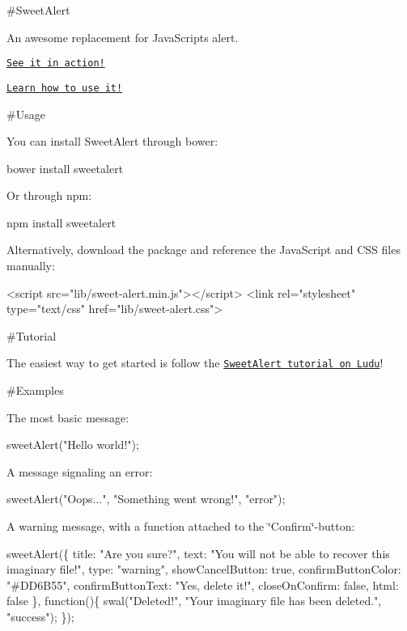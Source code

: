 \#\+Sweet\+Alert

An awesome replacement for Java\+Script\textquotesingle{}s alert.



\href{http://tristanedwards.me/sweetalert}{\tt See it in action!}

\href{https://www.ludu.co/lesson/how-to-use-sweetalert}{\tt Learn how to use it!}

\#\+Usage

You can install Sweet\+Alert through bower\+:


\begin{DoxyCode}
bower install sweetalert
\end{DoxyCode}


Or through npm\+:


\begin{DoxyCode}
npm install sweetalert
\end{DoxyCode}


Alternatively, download the package and reference the Java\+Script and C\+SS files manually\+:


\begin{DoxyCode}
<script src="lib/sweet-alert.min.js"></script>
<link rel="stylesheet" type="text/css" href="lib/sweet-alert.css">
\end{DoxyCode}


\#\+Tutorial

The easiest way to get started is follow the \href{https://www.ludu.co/lesson/how-to-use-sweetalert}{\tt Sweet\+Alert tutorial on Ludu}!

\#\+Examples

The most basic message\+:


\begin{DoxyCode}
sweetAlert("Hello world!");
\end{DoxyCode}


A message signaling an error\+:


\begin{DoxyCode}
sweetAlert("Oops...", "Something went wrong!", "error");
\end{DoxyCode}


A warning message, with a function attached to the \char`\"{}\+Confirm\char`\"{}-\/button\+:


\begin{DoxyCode}
sweetAlert(\{
  title: "Are you sure?",
  text: "You will not be able to recover this imaginary file!",
  type: "warning",
  showCancelButton: true,
  confirmButtonColor: "#DD6B55",
  confirmButtonText: "Yes, delete it!",
  closeOnConfirm: false,
  html: false
\}, function()\{
  swal("Deleted!",
  "Your imaginary file has been deleted.",
  "success");
\});
\end{DoxyCode}


